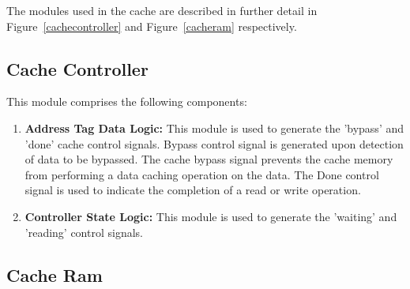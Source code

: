 The modules used in the cache are described in further detail in Figure~\ref{cachecontroller} and
Figure~\ref{cacheram} respectively.

\subsection{Cache Controller}

This module comprises the following components: 
\begin{enumerate}
\item \textbf{Address Tag Data Logic: }This module is used to generate the 'bypass' and 'done' cache control signals. Bypass control signal is generated upon detection of data to be bypassed. The cache bypass signal prevents the cache memory from performing a data caching operation on the data. The Done control signal is used to indicate the completion of a read or write operation.
\item \textbf{Controller State Logic: }This module is used to generate the 'waiting' and 'reading' control signals.
\end{enumerate}

\subsection{Cache Ram}

